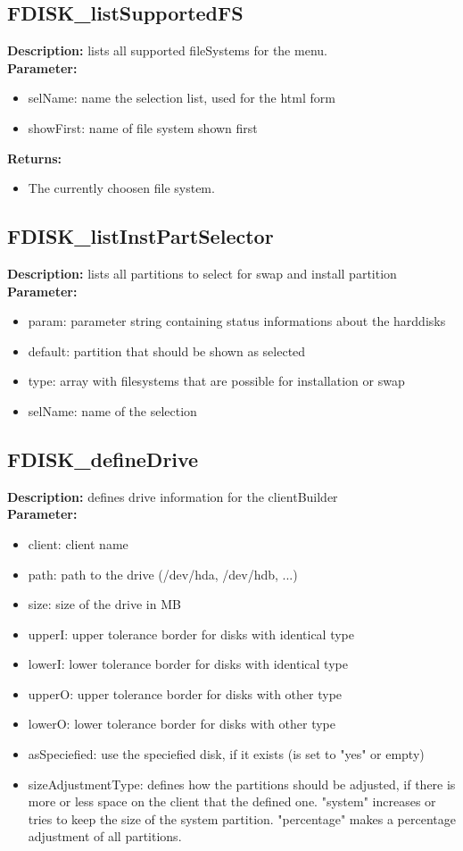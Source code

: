 \subsection{FDISK\_listSupportedFS}
\textbf{Description:} lists all supported fileSystems for the menu.\\
\textbf{Parameter:}
\begin{itemize}
\item selName: name the selection list, used for the html form
\item showFirst: name of file system shown first
\end{itemize}
\textbf{Returns:}
\begin{itemize}
\item The currently choosen file system.
\end{itemize}

\subsection{FDISK\_listInstPartSelector}
\textbf{Description:} lists all partitions to select for swap and install partition\\
\textbf{Parameter:}
\begin{itemize}
\item param: parameter string containing status informations about the harddisks
\item default: partition that should be shown as selected
\item type: array with filesystems that are possible for installation or swap
\item selName: name of the selection
\end{itemize}

\subsection{FDISK\_defineDrive}
\textbf{Description:} defines drive information for the clientBuilder\\
\textbf{Parameter:}
\begin{itemize}
\item client: client name
\item path: path to the drive (/dev/hda, /dev/hdb, ...)
\item size: size of the drive in MB
\item upperI: upper tolerance border for disks with identical type
\item lowerI: lower tolerance border for disks with identical type
\item upperO: upper tolerance border for disks with other type
\item lowerO: lower tolerance border for disks with other type
\item asSpeciefied: use the speciefied disk, if it exists (is set to "yes" or empty)
\item sizeAdjustmentType: defines how the partitions should be adjusted, if there is more or less space on the client that the defined one. "system" increases or tries to keep the size of the system partition. "percentage" makes a percentage adjustment of all partitions.
\end{itemize}

